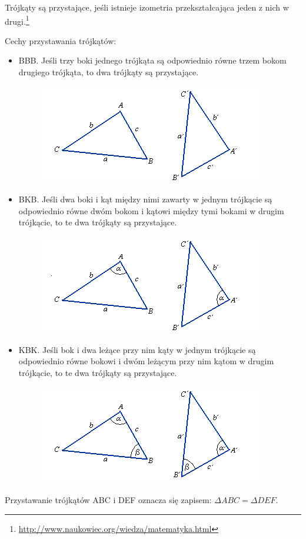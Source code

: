 \documentclass[11pt]{article}
\theoremstyle{definition}
\numberwithin{zad}{section}
\begin{document}
Trójkąty są przystające, jeśli istnieje izometria przekształcająca jeden z nich w drugi.\footnote{\url{http://www.naukowiec.org/wiedza/matematyka.html}}

Cechy przystawania trójkątów:
\begin{itemize}
\item BBB. Jeśli trzy boki jednego trójkąta są odpowiednio równe trzem bokom drugiego trójkąta, to dwa trójkąty są przystające.
\begin{figure}[h]
\centering
\includegraphics[width=0.5\linewidth]{cecha-bbb.png}
\end{figure}
\item BKB. Jeśli dwa boki i kąt między nimi zawarty w jednym trójkącie są odpowiednio równe dwóm bokom i kątowi między tymi bokami w drugim trójkącie, to te dwa trójkąty są przystające.
\begin{figure}[h]
\centering
\includegraphics[width=0.5\linewidth]{cecha-bkb.png}
\end{figure}
\item KBK. Jeśli bok i dwa leżące przy nim kąty w jednym trójkącie są odpowiednio równe bokowi i dwóm leżącym przy nim kątom w drugim trójkącie, to te dwa trójkąty są przystające.
\begin{figure}[h]
\centering
\includegraphics[width=0.5\linewidth]{cecha-kbk.png}
\end{figure}

\end{itemize}

Przystawanie trójkątów ABC i DEF oznacza się zapisem: $\Delta ABC = \Delta DEF$.
\end{document}

